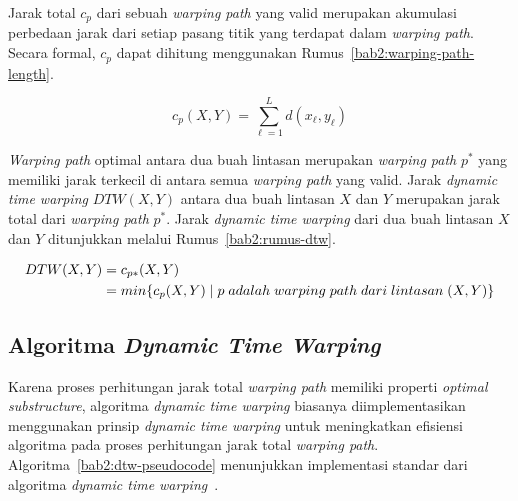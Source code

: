 Jarak total $c_p$ dari sebuah \textit{warping path} yang valid merupakan akumulasi perbedaan jarak dari setiap pasang titik yang terdapat dalam \textit{warping path}. Secara formal, $c_p$ dapat dihitung menggunakan Rumus~\ref{bab2:warping-path-length}.

\begin{equation}
    c_p(X, Y) = \sum_{\ell = 1}^{L} d(x_\ell, y_\ell)
    \label{bab2:warping-path-length}
\end{equation}

\textit{Warping path} optimal antara dua buah lintasan merupakan \textit{warping path} $p^*$ yang memiliki jarak terkecil di antara semua \textit{warping path} yang valid. Jarak \textit{dynamic time warping} $DTW(X, Y)$ antara dua buah lintasan $X$ dan $Y$ merupakan jarak total dari \textit{warping path} $p^*$. Jarak \textit{dynamic time warping} dari dua buah lintasan $X$ dan $Y$ ditunjukkan melalui Rumus~\ref{bab2:rumus-dtw}.

\begin{equation}
    \begin{aligned}
        DTW(X, Y) & = c\textsubscript{$p*$}(X, Y) \\
        & = min\{c_p(X, Y)\;|\;p\;adalah\;warping\;path\;dari\;lintasan\;(X, Y)\}
    \end{aligned}
    \label{bab2:rumus-dtw}
\end{equation}

\subsection{Algoritma \textit{Dynamic Time Warping}}
\label{subsec:algoritma-dtw}

Karena proses perhitungan jarak total \textit{warping path} memiliki properti \textit{optimal substructure}, algoritma \textit{dynamic time warping} biasanya diimplementasikan menggunakan prinsip \textit{dynamic time warping} untuk meningkatkan efisiensi algoritma pada proses perhitungan jarak total \textit{warping path}. Algoritma~\ref{bab2:dtw-pseudocode} menunjukkan implementasi standar dari algoritma \textit{dynamic time warping}~\cite{senin:02:dtw}.


